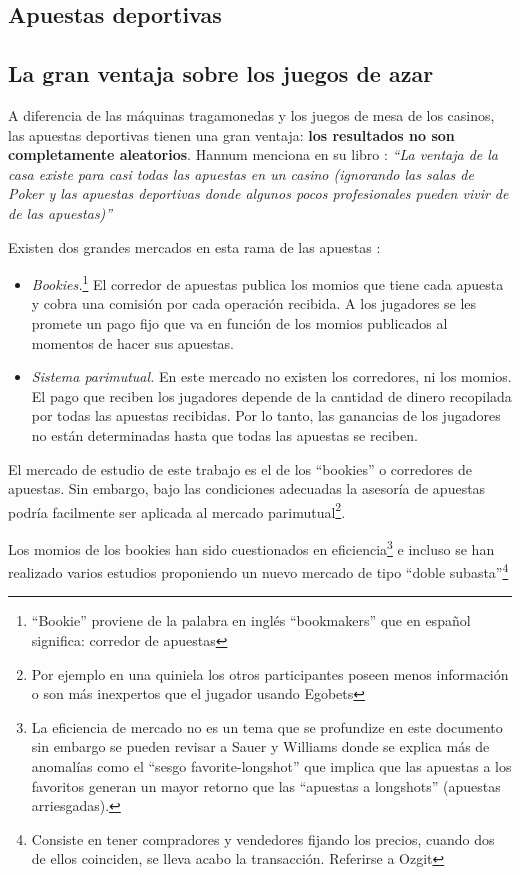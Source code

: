 \subsection{Apuestas deportivas}

\subsection{La gran ventaja sobre los juegos de azar}

A diferencia de las máquinas tragamonedas y los juegos de mesa de los casinos, las apuestas deportivas tienen una gran ventaja: \textbf{los resultados no son completamente aleatorios}. Hannum menciona en su libro \cite{hannum2005practical} : \emph{``La ventaja de la casa existe para casi todas las apuestas en un casino (ignorando las salas de Poker y las apuestas deportivas donde algunos pocos profesionales pueden vivir de de las apuestas)''}  

Existen dos grandes mercados en esta rama de las apuestas \cite{chung2010empirical}:
\begin{itemize} 
	\item \emph{Bookies.}\footnote{``Bookie'' proviene de la palabra en inglés ``bookmakers'' que en español significa: corredor de apuestas} El corredor de apuestas publica los momios que tiene cada apuesta y cobra una comisión por cada operación recibida. A los jugadores se les promete un pago fijo que va en función de los momios publicados al momentos de hacer sus apuestas.
	\item \emph{Sistema parimutual.} En este mercado no existen los corredores, ni los momios. El pago que reciben los jugadores depende de la cantidad de dinero recopilada por todas las apuestas recibidas. Por lo tanto, las ganancias de los jugadores no están determinadas hasta que todas las apuestas se reciben.
	\end{itemize}

El mercado de estudio de este trabajo es el de los ``bookies'' o corredores de apuestas. Sin embargo, bajo las condiciones adecuadas la asesoría de apuestas podría facilmente ser aplicada al mercado parimutual\footnote{Por ejemplo en una quiniela los otros participantes poseen menos información o son más inexpertos que el jugador usando Egobets}.

Los momios de los bookies han sido cuestionados en eficiencia\footnote{La eficiencia de mercado no es un tema que se profundize en este documento sin embargo se pueden revisar a Sauer \cite{sauer1998economics} y Williams \cite{williams1999information} donde se explica más de anomalías como el ``sesgo favorite-longshot'' que implica que las apuestas a los favoritos generan un mayor retorno que las ``apuestas a longshots'' (apuestas arriesgadas).  } e incluso se han realizado varios estudios proponiendo un nuevo mercado de tipo ``doble subasta''\footnote{Consiste en tener compradores y vendedores fijando los precios, cuando dos de ellos coinciden, se lleva acabo la transacción. Referirse a Ozgit\cite{ozgit2005posted} }

